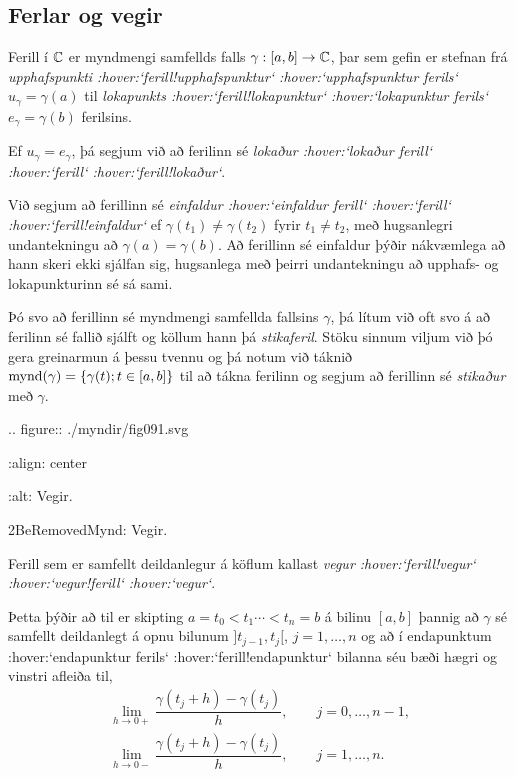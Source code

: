 \subsection*{Ferlar og vegir}


Ferill í  ${\mathbb C}$ er myndmengi samfellds falls $\gamma:[a,b]\to {\mathbb C}$, þar
sem gefin er stefnan frá {\it
upphafspunkti :hover:`ferill!upphafspunktur` :hover:`upphafspunktur
ferils`} $u_\gamma=\gamma(a)$
til {\it lokapunkts :hover:`ferill!lokapunktur` :hover:`lokapunktur
ferils`} $e_\gamma=\gamma(b)$ ferilsins.  

Ef $u_\gamma=e_\gamma$, þá segjum við að ferilinn sé {\it
lokaður :hover:`lokaður ferill` :hover:`ferill` :hover:`ferill!lokaður`}. 

Við
segjum að ferillinn sé {\it einfaldur :hover:`einfaldur
ferill` :hover:`ferill` :hover:`ferill!einfaldur`}  ef
$\gamma(t_1)\neq \gamma(t_2)$ fyrir $t_1\neq t_2$, með hugsanlegri
undantekningu að $\gamma(a)=\gamma(b)$.   Að ferillinn sé einfaldur
þýðir nákvæmlega að hann skeri ekki sjálfan sig, hugsanlega með þeirri
undantekningu að upphafs- og lokapunkturinn sé sá sami. 


Þó svo að
ferillinn sé myndmengi samfellda fallsins $\gamma$, þá lítum við
oft svo á að ferilinn sé fallið sjálft og köllum hann þá {\it
stikaferil}.    Stöku sinnum viljum við þó
gera greinarmun á þessu tvennu og þá notum við táknið 
${{\operatorname{mynd}(\gamma)}}=\{\gamma(t); t\in [a,b]\}$ til að
tákna ferilinn og segjum að ferillinn sé {\it stikaður} með 
$\gamma$. 

.. figure:: ./myndir/fig091.svg

    :align: center

    :alt: Vegir.

    2BeRemovedMynd: Vegir.


\noindent
Ferill sem er samfellt deildanlegur á köflum kallast {\it
vegur :hover:`ferill!vegur` :hover:`vegur!ferill` :hover:`vegur`}.

Þetta þýðir að til er skipting $a=t_0<t_1\cdots<t_n=b$ á bilinu
$[a,b]$ þannig að $\gamma$ sé samfellt deildanlegt á opnu bilunum
$]t_{j-1},t_j[$, $j=1,\dots, n$ og að í endapunktum :hover:`endapunktur
ferils` :hover:`ferill!endapunktur` bilanna séu bæði
hægri og vinstri afleiða til,
\begin{gather*}
\lim_{h\to 0+}\dfrac{\gamma(t_j+h)-\gamma(t_j)}h, \qquad
j=0,\dots,n-1,\\ 
\lim_{h\to 0-}\dfrac{\gamma(t_j+h)-\gamma(t_j)}h, \qquad
j=1,\dots,n.
\end{gather*}

